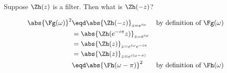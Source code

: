 Suppose $\Zh(z)$ is a  filter. \qquad Then what is  $\Zh(-z)$?

{\begin{align*}
  \abs{\Fg(\omega)}^2
    &\eqd \abs{\Zh(-z)}_{z=e^{i\omega}}
    && \text{by definition of $\Fg(\omega)$}
  \\&= \abs{\Zh(e^{-i\pi}z)}_{z=e^{i\omega}}
  \\&= \abs{\Zh(z)}_{z=e^{i\omega}e^{-i\pi}}
  \\&= \abs{\Zh(z)}_{z=e^{i(\omega-\pi)}}
  \\&\eqd \abs{\Fh(\omega-\pi)}^2
    && \text{by definition of $\Fh(\omega)$}
\end{align*}}


